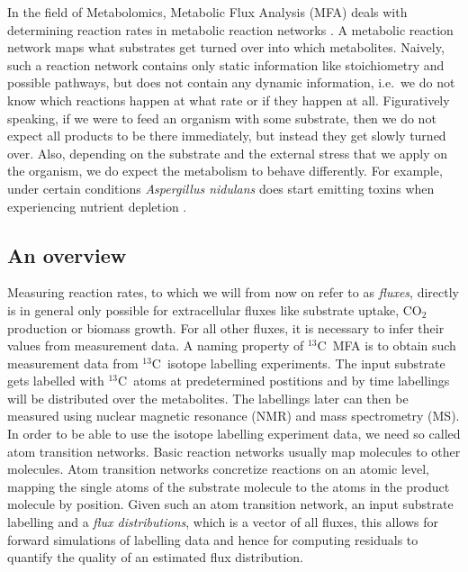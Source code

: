 \documentclass[10pt]{article}
\newcommand{\Ciso}{$^{13}$C~}
\newcommand{\ie}{i.e.~}
\newcommand{\todo}[1]{{\color{red}#1}}
\begin{document}
In the field of Metabolomics, Metabolic Flux Analysis (MFA) deals with determining reaction rates in metabolic reaction networks \cite{noeh15}.
A metabolic reaction network maps what substrates get turned over into which metabolites. 
Naively, such a reaction network contains only static information like stoichiometry and possible pathways,
but does not contain any dynamic information, \ie we do not know which reactions happen at what rate or if they happen at all.
Figuratively speaking, if we were to feed an organism with some substrate, then we do not expect all products to be there immediately, 
but instead they get slowly turned over.
Also, depending on the substrate and the external stress that we apply on the organism, we do expect the metabolism to behave differently.
For example, under certain conditions \textit{Aspergillus nidulans} does start emitting toxins when experiencing nutrient depletion \todo{\cite{?}}. 

\subsection{An overview}

Measuring reaction rates, to which we will from now on refer to as \emph{fluxes}, directly is in
general only possible for extracellular fluxes like substrate uptake, CO$_2$ production 
or biomass growth. 
For all other fluxes, it is necessary to infer their values from measurement data.
A naming property of \Ciso MFA is to obtain such measurement data from \Ciso isotope labelling 
experiments.
The input substrate gets labelled with \Ciso atoms at predetermined postitions and by time 
labellings will be distributed over the metabolites.
The labellings later can then be measured using nuclear magnetic resonance (NMR) and mass 
spectrometry (MS).
In order to be able to use the isotope labelling experiment data, we need so called atom 
transition networks.
Basic reaction networks usually map molecules to other molecules. 
Atom transition networks concretize reactions on an atomic level, mapping the single atoms of 
the substrate molecule to the atoms in the product molecule by position.
Given such an atom transition network, an input substrate labelling and a \emph{flux 
distributions}, which is a vector of all fluxes, this allows for forward simulations of 
labelling data and hence for computing residuals to quantify the quality of an estimated 
flux distribution.
\end{document}
